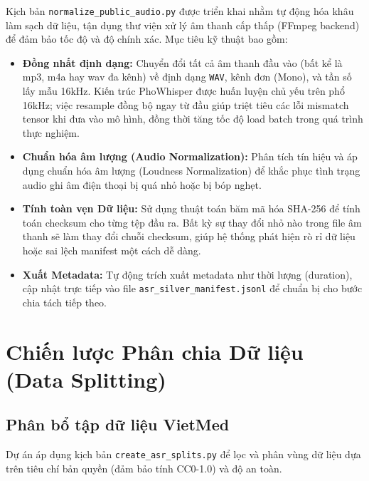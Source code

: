 \documentclass[12pt,a4paper]{article}
\begin{document}
Kịch bản \texttt{normalize\_public\_audio.py} được triển khai nhằm tự động hóa khâu làm sạch dữ liệu, tận dụng thư viện xử lý âm thanh cấp thấp (FFmpeg backend) để đảm bảo tốc độ và độ chính xác. Mục tiêu kỹ thuật bao gồm:
\begin{itemize}[leftmargin=1.2cm]
    \item \textbf{Đồng nhất định dạng:} Chuyển đổi tất cả âm thanh đầu vào (bất kể là mp3, m4a hay wav đa kênh) về định dạng \texttt{WAV}, kênh đơn (Mono), và tần số lấy mẫu 16kHz. Kiến trúc PhoWhisper được huấn luyện chủ yếu trên phổ 16kHz; việc resample đồng bộ ngay từ đầu giúp triệt tiêu các lỗi mismatch tensor khi đưa vào mô hình, đồng thời tăng tốc độ load batch trong quá trình thực nghiệm.
    \item \textbf{Chuẩn hóa âm lượng (Audio Normalization):} Phân tích tín hiệu và áp dụng chuẩn hóa âm lượng (Loudness Normalization) để khắc phục tình trạng audio ghi âm điện thoại bị quá nhỏ hoặc bị bóp nghẹt.
    \item \textbf{Tính toàn vẹn Dữ liệu:} Sử dụng thuật toán băm mã hóa SHA-256 để tính toán checksum cho từng tệp đầu ra. Bất kỳ sự thay đổi nhỏ nào trong file âm thanh sẽ làm thay đổi chuỗi checksum, giúp hệ thống phát hiện rò rỉ dữ liệu hoặc sai lệch manifest một cách dễ dàng.
    \item \textbf{Xuất Metadata:} Tự động trích xuất metadata như thời lượng (duration), cập nhật trực tiếp vào file \texttt{asr\_silver\_manifest.jsonl} để chuẩn bị cho bước chia tách tiếp theo.
\end{itemize}

\section{Chiến lược Phân chia Dữ liệu (Data Splitting)}

\subsection{Phân bổ tập dữ liệu VietMed}

Dự án áp dụng kịch bản \texttt{create\_asr\_splits.py} để lọc và phân vùng dữ liệu dựa trên tiêu chí bản quyền (đảm bảo tính CC0-1.0) và độ an toàn.
\end{document}
